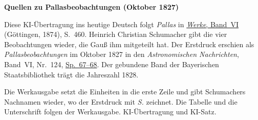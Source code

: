 \clearpage\thispagestyle{empty}
\begin{center}\textbf{Quellen zu Pallasbeobachtungen (Oktober 1827)}\end{center}
\noindent Diese KI-Übertragung ins heutige Deutsch folgt \textit{Pallas} in \href{https://gdz.sub.uni-goettingen.de/id/PPN236007467}{\textit{Werke}, Band~VI} (Göttingen, 1874), S.~460. Heinrich Christian Schumacher gibt die vier Beobachtungen wieder, die Gauß ihm mitgeteilt hat. Der Erstdruck erschien als \textit{Pallasbeobachtungen} im Oktober 1827 in den \textit{Astronomischen Nachrichten}, Band~VI, Nr.~124, \href{https://api.digitale-sammlungen.de/iiif/image/v2/bsb10049431_00050/full/1550,/0/default.jpg}{Sp.~67--68}. Der gebundene Band der Bayerischen Staatsbibliothek trägt die Jahreszahl 1828.
\par\smallskip\noindent Die Werkausgabe setzt die Einheiten in die erste Zeile und gibt Schumachers Nachnamen wieder, wo der Erstdruck mit \textit{S.} zeichnet. Die Tabelle und die Unterschrift folgen der Werkausgabe. KI-Übertragung und KI-Satz.
\clearpage
